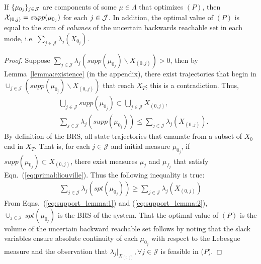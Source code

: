 \begin{lemma}
If $\{\mu_{0_j}\}_{j \in {\cal J}}$ are components of some $\mu \in \Lambda$ that optimizes $(P)$, then ${\cal X}_{(0,j)} = supp(\mu_{0_j})$ for each $j \in {\cal J}$.
In addition, the optimal value of $(P)$ is equal to the sum of \emph{volumes} of the uncertain backwards reachable set in each mode, i.e. $\sum_{j\in \mathcal J}\lambda_j(X_{0_j})$.
\end{lemma}
\begin{proof}
Suppose $\sum_{j\in \mathcal J}\lambda_j(supp(\mu_{0_j})\backslash X_{(0,j)})>0$, then by Lemma~\ref{lemma:existence} (in the appendix), there exist trajectories that begin in $\cup_{j\in \mathcal J}(supp(\mu_{0_j})\backslash X_{(0,j)})$ that reach $X_T$; this is a contradiction. Thus,
  \begin{align}
  &\bigcup_{j\in \mathcal J} supp(\mu_{0_j})\subset \bigcup_{j\in \mathcal J} X_{(0,j)},\\
  &\sum_{j\in \mathcal J}\lambda_j(supp(\mu_{0_j}))\le\sum_{j\in \mathcal J}\lambda_j( X_{(0,j)}).
  \label{eq:support_lemma:1}
  \end{align}
By definition of the BRS, all state trajectories that emanate from a subset of $X_0$ end in $X_T$. That is, for each $j\in \mathcal J$ and initial measure $\mu_{0_j}$, if $supp(\mu_{0_j})\subset X_{(0,j)}$, there exist measures $\mu_{j}$ and $\mu_{f_j}$ that satisfy Eqn.~(\ref{eq:primal:liouville}). 
Thus the following inequality is true:
    \begin{align}
    \sum_{j\in \mathcal J}\lambda_j(spt(\mu_{0_j}))\ge \sum_{j\in \mathcal J}\lambda_j(X_{(0,j)})
      \label{eq:support_lemma:2}
    \end{align}
From Eqns.~(\ref{eq:support_lemma:1}) and (\ref{eq:support_lemma:2}), $\cup_{j\in \mathcal J}\,spt(\mu_{0_j})$ is the BRS of the system. 
That the optimal value of $(P)$ is the volume of the uncertain backward reachable set follows by noting that the slack variables ensure absolute continuity of each $\mu_{0_j}$ with respect to the Lebesgue measure and the observation that \mbox{$\lambda_{j}|_{X_{(0,j)}},\forall j\in \mathcal J$} is feasible in ($P$).
  \end{proof}

